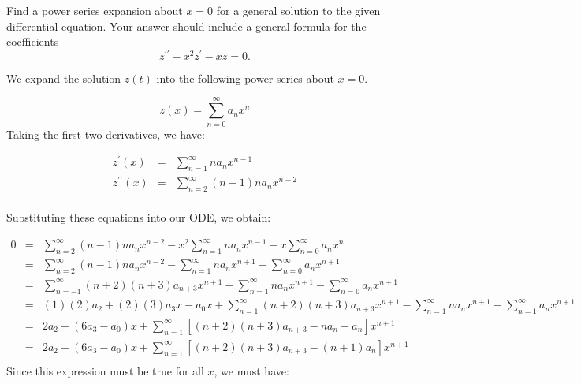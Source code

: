 \documentclass[11pt]{article}
\begin{document}
\begin{problem}
{ Find a power series expansion about $x =0$ for a general solution to the given differential equation. Your answer should include a general formula for the coefficients}
\begin{equation*}
z^{\prime \prime} - x^2 z^{\prime} - xz =0.
\end{equation*}
\end{problem}

\begin{solution}
We expand the solution $z(t)$ into the following power series about $x=0$.

\begin{equation*}
z(x) = \sum_{n=0}^{\infty} a_{n} x^n
\end{equation*}
Taking the first two derivatives, we have:

\begin{eqnarray*}
z^{\prime}(x) & = & \sum_{n=1}^{\infty} n a_{n} x^{n-1} \\
z^{\prime \prime}(x) & = & \sum_{n=2}^{\infty} (n-1)n a_{n} x^{n-2} \\
\end{eqnarray*}

Substituting these equations into our ODE, we obtain:

\begin{eqnarray*}
0 & = & \sum_{n=2}^{\infty} (n-1)n a_{n} x^{n-2} - x^2 \sum_{n=1}^{\infty} n a_{n} x^{n-1} - x \sum_{n=0}^{\infty} a_{n} x^n \\
& = & \sum_{n=2}^{\infty} (n-1)n a_{n} x^{n-2} - \sum_{n=1}^{\infty} n a_{n} x^{n+1} -  \sum_{n=0}^{\infty} a_{n} x^{n+1} \\
& = & \sum_{n=-1}^{\infty} (n+2)(n+3) a_{n+3} x^{n+1} - \sum_{n=1}^{\infty} n a_{n} x^{n+1} -  \sum_{n=0}^{\infty} a_{n} x^{n+1} \\
& = & (1)(2)a_{2} + (2)(3)a_{3}x - a_{0}x+ \sum_{n=1}^{\infty} (n+2)(n+3) a_{n+3} x^{n+1} - \sum_{n=1}^{\infty} n a_{n} x^{n+1} -  \sum_{n=1}^{\infty} a_{n} x^{n+1} \\
& = & 2a_{2} + (6a_{3} - a_{0})x+ \sum_{n=1}^{\infty} \left[ (n+2)(n+3) a_{n+3}-n a_{n}-a_{n} \right] x^{n+1}\\
& = & 2a_{2} + (6a_{3} - a_{0})x+ \sum_{n=1}^{\infty} \left[ (n+2)(n+3) a_{n+3}-(n+1)a_{n} \right] x^{n+1}\\
\end{eqnarray*}
Since this expression must be true for all $x$, we must have:


\end{solution}
\end{document}
